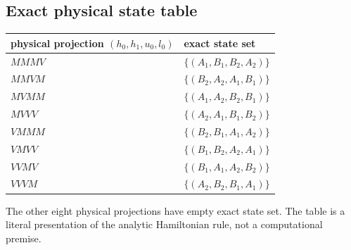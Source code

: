 \documentclass[11pt]{article}
\theoremstyle{definition}
\theoremstyle{remark}
\begin{document}
\subsection{Exact physical state
table}\label{f.4.-exact-physical-state-table}

\begin{longtable}[]{@{}ll@{}}
\toprule\noalign{}
physical projection \((h_0,h_1,u_0,l_0)\) & exact state set \\
\midrule\noalign{}
\endhead
\bottomrule\noalign{}
\endlastfoot
\(MMMV\) & \(\{(A_1,B_1,B_2,A_2)\}\) \\
\(MMVM\) & \(\{(B_2,A_2,A_1,B_1)\}\) \\
\(MVMM\) & \(\{(A_1,A_2,B_2,B_1)\}\) \\
\(MVVV\) & \(\{(A_2,A_1,B_1,B_2)\}\) \\
\(VMMM\) & \(\{(B_2,B_1,A_1,A_2)\}\) \\
\(VMVV\) & \(\{(B_1,B_2,A_2,A_1)\}\) \\
\(VVMV\) & \(\{(B_1,A_1,A_2,B_2)\}\) \\
\(VVVM\) & \(\{(A_2,B_2,B_1,A_1)\}\) \\
\end{longtable}

The other eight physical projections have empty exact state set. The
table is a literal presentation of the analytic Hamiltonian rule, not a
computational premise.
\end{document}
